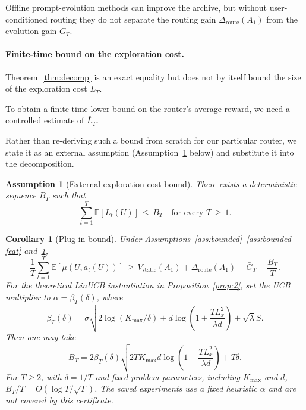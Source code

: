\documentclass{article} %
\newtheorem{corollary}[theorem]{Corollary}
\newtheorem{assumption}{Assumption}
\providecommand{\E}{\mathbb{E}}
\begin{document}
Offline prompt-evolution methods can improve the archive, but without user-conditioned routing they do not separate the routing gain $\Delta_{\mathrm{route}}(A_1)$ from the evolution gain $\bar G_T$.

\paragraph{Finite-time bound on the exploration cost.}

\label{sec:method-plugin}

Theorem~\ref{thm:decomp} is an exact equality but does not by itself bound the size of the exploration cost $\bar L_T$.

To obtain a finite-time lower bound on the router's average reward, we need a controlled estimate of $\bar L_T$.

Rather than re-deriving such a bound from scratch for our particular router, we state it as an external assumption (Assumption~\ref{ass:Bt} below) and substitute it into the decomposition.

\begin{assumption}[External exploration-cost bound]
\label{ass:Bt}
There exists a deterministic sequence $B_T$ such that
\begin{equation}
\label{eq:ass-Bt}
\sum_{t=1}^T \E[L_t(U)] \,\le\, B_T \quad \text{for every } T \,\ge\, 1.
\end{equation}
\end{assumption}

\begin{corollary}[Plug-in bound]
\label{cor:plugin}
Under Assumptions~\ref{ass:bounded}--\ref{ass:bounded-feat} and~\ref{ass:Bt},
\begin{equation}
\label{eq:cor-plugin}
\frac{1}{T}\sum_{t=1}^T \E[\mu(U, a_t(U))]
\,\ge\, V_{\mathrm{static}}(A_1) + \Delta_{\mathrm{route}}(A_1) + \bar G_T - \frac{B_T}{T}.
\end{equation}
For the theoretical LinUCB instantiation in Proposition~\ref{prop:2}, set the UCB multiplier to $\alpha=\beta_T(\delta)$, where
\begin{equation}
\label{eq:cor-plugin-beta}
\beta_T(\delta)
=
\sigma\sqrt{2\log(K_{\max}/\delta)
+d\log\!\left(1+\frac{TL_x^2}{\lambda d}\right)}
+\sqrt{\lambda}S.
\end{equation}
Then one may take
\begin{equation}
\label{eq:cor-plugin-rate}
B_T
=
2\beta_T(\delta)
\sqrt{2TK_{\max}d
\log\!\left(1+\frac{TL_x^2}{\lambda d}\right)}
+T\delta.
\end{equation}
For \(T\ge2\), with \(\delta=1/T\) and fixed problem parameters, including \(K_{\max}\) and
\(d\), \(B_T/T=O(\log T/\sqrt T)\). The saved experiments use a fixed
heuristic \(\alpha\) and are not covered by this certificate.
\end{corollary}
\end{document}
